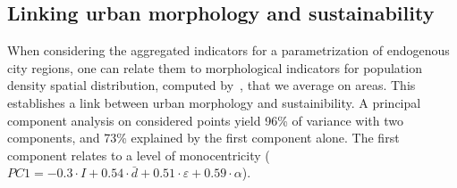 \documentclass{jimis-en}
\begin{document}






\subsection{Linking urban morphology and sustainability}



When considering the aggregated indicators for a parametrization of endogenous city regions, one can relate them to morphological indicators for population density spatial distribution, computed by~\cite{raimbault2018calibration}, that we average on areas. This establishes a link between urban morphology and sustainibility. A principal component analysis on considered points yield 96\% of variance with two components, and 73\% explained by the first component alone. The first component relates to a level of monocentricity ($PC1 = -0.3\cdot I + 0.54 \cdot \bar{d} + 0.51\cdot \varepsilon + 0.59 \cdot \alpha$).
\end{document}

